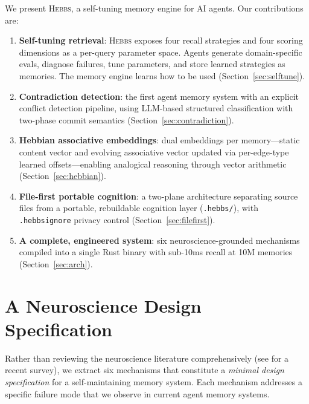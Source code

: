 \documentclass{article}
\begin{document}
We present \textsc{Hebbs}, a self-tuning memory engine for AI agents. Our contributions are:

\begin{enumerate}
    \item \textbf{Self-tuning retrieval}: \textsc{Hebbs} exposes four recall strategies and four scoring dimensions as a per-query parameter space. Agents generate domain-specific evals, diagnose failures, tune parameters, and store learned strategies as memories. The memory engine learns how to be used (Section~\ref{sec:selftune}).
    \item \textbf{Contradiction detection}: the first agent memory system with an explicit conflict detection pipeline, using LLM-based structured classification with two-phase commit semantics (Section~\ref{sec:contradiction}).
    \item \textbf{Hebbian associative embeddings}: dual embeddings per memory---static content vector and evolving associative vector updated via per-edge-type learned offsets---enabling analogical reasoning through vector arithmetic (Section~\ref{sec:hebbian}).
    \item \textbf{File-first portable cognition}: a two-plane architecture separating source files from a portable, rebuildable cognition layer (\texttt{.hebbs/}), with \texttt{.hebbsignore} privacy control (Section~\ref{sec:filefirst}).
    \item \textbf{A complete, engineered system}: six neuroscience-grounded mechanisms compiled into a single Rust binary with sub-10ms recall at 10M memories (Section~\ref{sec:arch}).
\end{enumerate}

\section{A Neuroscience Design Specification}
\label{sec:neuro}

Rather than reviewing the neuroscience literature comprehensively (see \citet{aimeetsbrain} for a recent survey), we extract six mechanisms that constitute a \emph{minimal design specification} for a self-maintaining memory system. Each mechanism addresses a specific failure mode that we observe in current agent memory systems.
\end{document}
